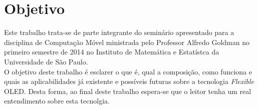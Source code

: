 \section{Objetivo}
\label{sec:objetivo}

Este trabalho trata-se de parte integrante do seminário apresentado para a disciplina de Computação Móvel ministrada pelo Professor Alfredo Goldman no primeiro semestre de 2014 no Instituto de Matemática e Estatístca da Universidade de São Paulo. \\

O objetivo deste trabalho é esclarer o que é, qual a composição, como funciona e quais as aplicabilidades já existente e possíveis futuras sobre a tecnologia \textit{Flexible} OLED. Desta forma, ao final deste trabalho espera-se que o leitor tenha um real entendimento sobre esta tecnolgia.

